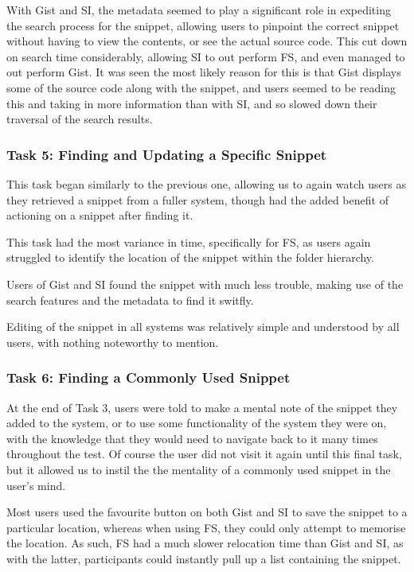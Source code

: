 With Gist and SI, the metadata seemed to play a significant role in expediting the search process for the snippet, allowing users to pinpoint the correct snippet without having to view the contents, or see the actual source code.
This cut down on search time considerably, allowing SI to out perform FS, and even managed to out perform Gist.
It was seen the most likely reason for this is that Gist displays some of the source code along with the snippet, and users seemed to be reading this and taking in more information than with SI, and so slowed down their traversal of the search results.

\subsubsection{Task 5: Finding and Updating a Specific Snippet}
This task began similarly to the previous one, allowing us to again watch users as they retrieved a snippet from a fuller system, though had the added benefit of actioning on a snippet after finding it.

This task had the most variance in time, specifically for FS, as users again struggled to identify the location of the snippet within the folder hierarchy.

Users of Gist and SI found the snippet with much less trouble, making use of the search features and the metadata to find it switfly. 

Editing of the snippet in all systems was relatively simple and understood by all users, with nothing noteworthy to mention.

\subsubsection{Task 6: Finding a Commonly Used Snippet}
At the end of Task 3, users were told to make a mental note of the snippet they added to the system, or to use some functionality of the system they were on, with the knowledge that they would need to navigate back to it many times throughout the test. 
Of course the user did not visit it again until this final task, but it allowed us to instil the the mentality of a commonly used snippet in the user's mind.

Most users used the favourite button on both Gist and SI to save the snippet to a particular location, whereas when using FS, they could only attempt to memorise the location.
As such, FS had a much slower relocation time than Gist and SI, as with the latter, participants could instantly pull up a list containing the snippet. 

